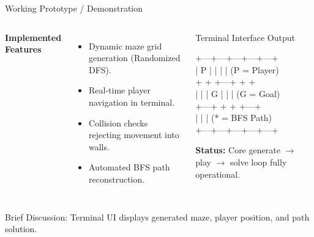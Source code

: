 \documentclass[aspectratio=169,11pt]{beamer}
\newcommand{\smallnote}[1]{%
\vspace{0.08cm}
{\scriptsize\color{GEUGrey}#1}
}
\begin{document}
\begin{frame}{Working Prototype / Demonstration}

\begin{columns}[T,totalwidth=\textwidth]


\textbf{\color{GEUBlue}Implemented Features}

\begin{itemize}\itemsep3pt
\item Dynamic maze grid generation (Randomized DFS).
\item Real-time player navigation in terminal.
\item Collision checks rejecting movement into walls.
\item Automated BFS path reconstruction.
\end{itemize}


\begin{block}{Terminal Interface Output}

\ttfamily\scriptsize
+---+---+---+---+---+\\
| P |   |       |   | \quad (P = Player)\\
+   +   +---+   +   +\\
|   |   | G |   |   | \quad (G = Goal)\\
+---+   +   +   +---+\\
|       |           | \quad (* = BFS Path)\\
+---+---+---+---+---+

\vspace{2mm}
\sffamily\scriptsize
\textbf{Status:} Core generate $\rightarrow$ play $\rightarrow$ solve loop fully operational.

\end{block}

\end{columns}

\vfill

\smallnote{
Brief Discussion: Terminal UI displays generated maze, player position, and path solution.
}

\end{frame}
\end{document}
